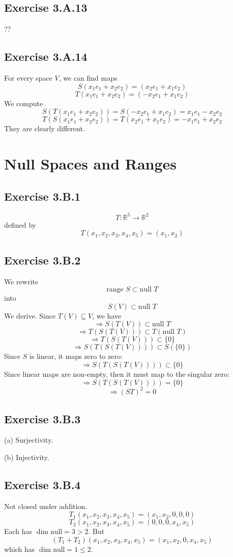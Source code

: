 \documentclass{book}
\begin{document}
\subsection*{Exercise 3.A.13}
??

\subsection*{Exercise 3.A.14}
For every space $V$, we can find maps
$$S(x_1 e_1 + x_2 e_2) = (x_2 e_1 + x_1 e_2)$$
$$T(x_1 e_1 + x_2 e_2) = (-x_2 e_1 + x_1 e_2)$$
We compute
$$S(T(x_1 e_1 + x_2 e_2)) = S(-x_2 e_1 + x_1 e_2) = x_1 e_1 - x_2 e_2$$
$$T(S(x_1 e_1 + x_2 e_2)) = T(x_2 e_1 + x_1 e_2) = - x_1 e_1 + x_2 e_2$$
They are clearly different.

\section{Null Spaces and Ranges}

\subsection*{Exercise 3.B.1}
$$T: \mathbb{R}^5 \rightarrow \mathbb{R}^2$$
defined by
$$T(x_1, x_2, x_3, x_4, x_5) = (x_1, x_2)$$

\subsection*{Exercise 3.B.2}
We rewrite
$$\text{range } S \subset \text{null } T$$
into
$$S(V) \subset \text{null } T$$
We derive. Since $T(V) \subseteq V$, we have
$$\Rightarrow S(T(V)) \subset \text{null } T$$
$$\Rightarrow T(S(T(V))) \subset T(\text{null } T)$$
$$\Rightarrow T(S(T(V))) \subset \{ 0 \}$$
$$\Rightarrow S(T(S(T(V)))) \subset S(\{ 0 \})$$
Since $S$ is linear, it maps zero to zero:
$$\Rightarrow S(T(S(T(V)))) \subset \{ 0 \}$$
Since linear maps are non-empty, then it must map to the singular zero:
$$\Rightarrow S(T(S(T(V)))) = \{ 0 \}$$
$$\Rightarrow (ST)^2 = 0$$

\subsection*{Exercise 3.B.3}
(a)
Surjectivity.

\noindent
(b)
Injectivity.

\subsection*{Exercise 3.B.4}
Not closed under addition.
$$T_1 (x_1, x_2, x_3, x_4, x_5) = (x_1, x_2, 0, 0, 0)$$
$$T_2 (x_1, x_2, x_3, x_4, x_5) = (0, 0, 0, x_4, x_5)$$
Each has $\dim \text{null} = 3 > 2$. But
$$(T_1 + T_2) (x_1, x_2, x_3, x_4, x_5) = (x_1, x_2, 0, x_4, x_5)$$
which has $\dim \text{null} = 1 \leq 2$.
\end{document}
